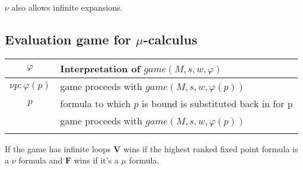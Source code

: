 \documentclass{tufte-handout}
\newcommand{\V}{\ensuremath{\mathbf{V}}\xspace}
\newcommand{\F}{\ensuremath{\mathbf{F}}\xspace}
\begin{document}
$\nu$ also allows infinite expansions.
\subsection{Evaluation game for $\mu$-calculus}
\begin{tabular}{cl}
$\varphi$ & Interpretation of $game(M,s,w,\varphi)$\\\hline
$\nu p: \varphi(p)$ &  game proceeds with $game(M,s,w,\varphi(p))$\\
$p$ & formula to which $p$ is bound is substituted back in for p\\
& game proceeds with $game(M,s,w,\varphi(p))$\\\\
\end{tabular}
If the game has infinite loops \V wins if the highest ranked fixed point formula is a $\nu$ formula and \F wins if it's a $\mu$ formula.
\nocite{*}


\end{document}
